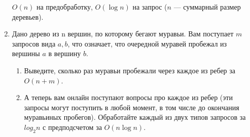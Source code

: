 \begin{enumerate}
	$O(n)$ на предобработку, $O(\log n)$ на запрос ($n$ — суммарный размер деревьев).
	
	\item Дано дерево из n вершин, по которому бегают муравьи. Вам поступает $m$
	запросов вида $a, b$, что означает, что очередной муравей пробежал из вершины $a$ в вершину 
	$b$.
	
	\begin{enumerate}
		\item Выведите, сколько раз муравьи пробежали через каждое из ребер за $O(n + m)$.
		\item А теперь вам онлайн поступают вопросы про каждое из ребер (эти запросы могут поступить в любой момент, в том числе до окончания муравьиных пробегов). Обработайте каждый из двух типов запросов за $log_2 n$ с предподсчетом за $O(n \log n)$.
	\end{enumerate}
\end{enumerate}


